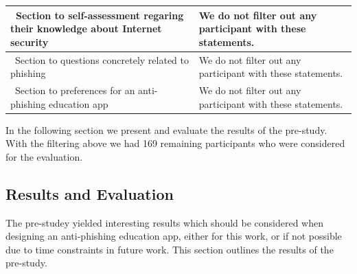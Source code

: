 \begin{center}
\begin{tabular}{ | p{5cm} | p{10cm} |}
    \hline\  Section to self-assessment regaring their knowledge about Internet security &  We do not filter out any participant with these statements.\\
		\hline\  Section to questions concretely related to phishing & We do not filter out any participant with these statements. \\
    \hline\  Section to preferences for an anti-phishing education app & We do not filter out any participant with these statements.\\
    \hline
    \end{tabular}
		
\end{center}

In the following section we present and evaluate the results of the pre-study. With the filtering above we had 169 remaining participants who were considered for the evaluation.
\subsection{Results and Evaluation}
The pre-studey yielded interesting results which should be considered when designing an anti-phishing education app, either for this work, or if not possible due to time constraints in future work. This section outlines the results of the pre-study.

